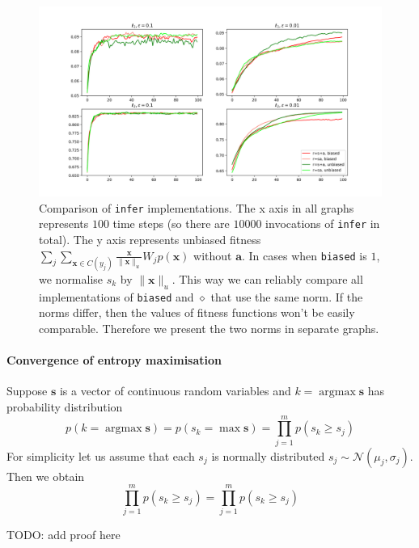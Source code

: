 \documentclass[12pt]{article}
\DeclareMathOperator*{\argmax}{argmax}
\begin{document}
\begin{figure}[!htbp]
	\centering
	\includegraphics[width=13.8cm]{benchmarks_l_bias_entropy_lr}
	\caption{Comparison of \texttt{infer} implementations. The x axis in all graphs represents $100$ time steps (so there are $10000$ invocations of \texttt{infer} in total). The y axis represents unbiased fitness $\sum_{j}\sum_{\boldsymbol{x}\in C(y_j)} \frac{\boldsymbol{x}}{\lVert \boldsymbol{x} \rVert_u} W_j p(\boldsymbol{x})$ without $\boldsymbol{a}$. In cases when \texttt{biased} is $1$, we normalise $s_k$ by $\lVert \boldsymbol{x} \rVert_u$. This way we can reliably compare all implementations of \texttt{biased} and $\diamond$ that use the same norm. If the norms differ, then the values of fitness functions won't be easily comparable. Therefore we present the two norms in separate graphs.}
	\label{fig:benchmarks_l_bias_entropy_lr}
\end{figure}


\paragraph{Convergence of entropy maximisation}

Suppose $\boldsymbol{s}$ is a vector of continuous random variables and $k=\argmax \boldsymbol{s}$ has  probability distribution
\[
p(k=\argmax \boldsymbol{s}) = p(s_k = \max \boldsymbol{s}) = \prod_{j=1}^{m}p(s_k \ge  s_j)
\]
For simplicity let us assume that each $s_j$ is normally distributed $s_j\sim \mathcal{N}(\mu_j,\sigma_j)$. Then we obtain
\[
\prod_{j=1}^{m}p(s_k \ge  s_j) = \prod_{j=1}^{m}p(s_k \ge  s_j)
\]

TODO: add proof here
\end{document}
